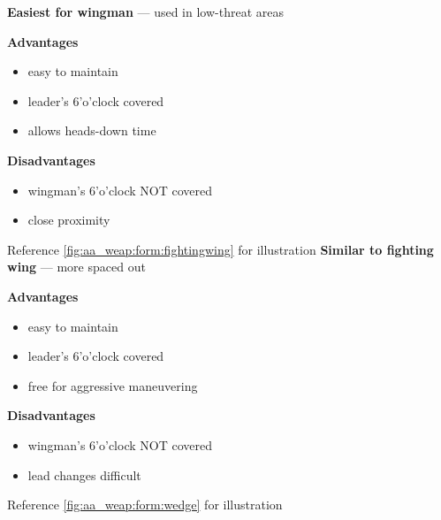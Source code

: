 \begin{tcoloritemize}
    \textbf{Easiest for wingman} --- used in low-threat areas

    \medskip

    \textbf{Advantages}
    \begin{itemize}
        \item easy to maintain
        \item leader's 6'o'clock covered
        \item allows heads-down time
    \end{itemize}

    \textbf{Disadvantages}
    \begin{itemize}
        \item wingman's 6'o'clock NOT covered
        \item close proximity
    \end{itemize}

    Reference \cref{fig:aa_weap:form:fightingwing} for illustration
    \blueitem[Wedge]
    \textbf{Similar to fighting wing} --- more spaced out
    
    \medskip

    \textbf{Advantages}
    \begin{itemize}
        \item easy to maintain
        \item leader's 6'o'clock covered
        \item free for aggressive maneuvering
    \end{itemize}

    \textbf{Disadvantages}
    \begin{itemize}
        \item wingman's 6'o'clock NOT covered
        \item lead changes difficult
    \end{itemize}

    Reference \cref{fig:aa_weap:form:wedge} for illustration
\end{tcoloritemize}

